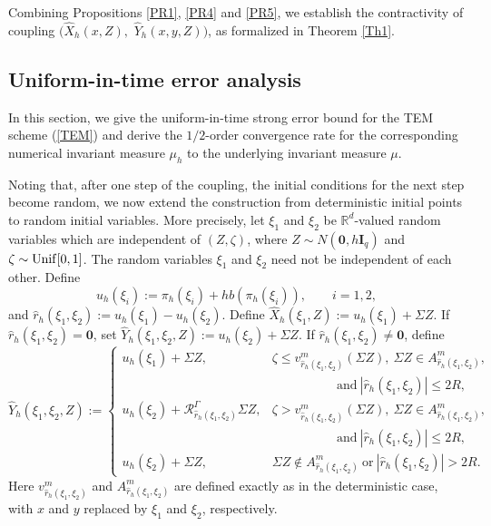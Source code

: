 \documentclass[aap]{imsart}
\theoremstyle{plain}
\theoremstyle{definition}
\begin{document}
			Combining Propositions \ref{PR1}, \ref{PR4} and \ref{PR5}, we establish the contractivity of coupling $(\hat{X}_h(x,Z),$ $ \hat{Y}_h(x, y,Z))$, as formalized in Theorem \ref{Th1}.
			
			\subsection{Uniform-in-time error analysis}
			In this section, we give the uniform-in-time strong error bound for the TEM scheme (\ref{TEM}) and derive the $1/2$-order convergence rate for the corresponding numerical invariant measure $\mu_h$ to the underlying invariant measure $\mu$. 
			
			Noting that, after one step of the coupling, the initial conditions for the
			next step become random, we now extend the construction from deterministic
			initial points to random initial variables. More precisely, let
			\(\xi_1\) and \(\xi_2\) be \(\mathbb R^d\)-valued random variables which are
			independent of \((Z,\zeta)\), where \(Z\sim N(\mathbf 0,h\mathbf I_q)\) and \(\zeta\sim {\rm Unif}[0,1]\).
			The random variables \(\xi_1\) and \(\xi_2\) need not be independent of each
			other. Define
			\[
			u_h(\xi_i):=\pi_h(\xi_i)+h b(\pi_h(\xi_i)),
			\qquad i=1,2,
			\]
			and \(\hat r_h(\xi_1,\xi_2):=u_h(\xi_1)-u_h(\xi_2)\).
			Define \(\hat X_h(\xi_1,Z):=u_h(\xi_1)+\Sigma Z\).
			If \(\hat r_h(\xi_1,\xi_2)=\mathbf 0\), set \(\hat Y_h(\xi_1,\xi_2,Z):=u_h(\xi_2)+\Sigma Z\).
			If \(\hat r_h(\xi_1,\xi_2)\neq\mathbf 0\), define
			\begin{equation}\label{XY0}
				\hat Y_h(\xi_1,\xi_2,Z)
				:=
				\begin{cases}
					u_h(\xi_1)+\Sigma Z,
					& \zeta\leqslant v_{\hat r_h(\xi_1,\xi_2)}^m(\Sigma Z),\
					\Sigma Z\in A_{\hat r_h(\xi_1,\xi_2)}^m,\\
					&~~~~~~~~~~~~~~~~~~~~~~~\text{and}~|\hat r_h(\xi_1,\xi_2)|\leqslant 2R,\\[1mm]
					u_h(\xi_2)+\mathcal R_{\hat r_h(\xi_1,\xi_2)}^\Gamma \Sigma Z,
					& \zeta> v_{\hat r_h(\xi_1,\xi_2)}^m(\Sigma Z),\
					\Sigma Z\in A_{\hat r_h(\xi_1,\xi_2)}^m,\\
					&~~~~~~~~~~~~~~~~~~~~~~~\text{and}~|\hat r_h(\xi_1,\xi_2)|\leqslant 2R,\\[1mm]
					u_h(\xi_2)+\Sigma Z,
					& \Sigma Z\notin A_{\hat r_h(\xi_1,\xi_2)}^m
					~\text{or}~
					|\hat r_h(\xi_1,\xi_2)|>2R .
				\end{cases}
			\end{equation}
			Here \(v_{\hat r_h(\xi_1,\xi_2)}^m\) and \(A_{\hat r_h(\xi_1,\xi_2)}^m\)
			are defined exactly as in the deterministic case, with \(x\) and \(y\)
			replaced by \(\xi_1\) and \(\xi_2\), respectively.
			
\end{document}
